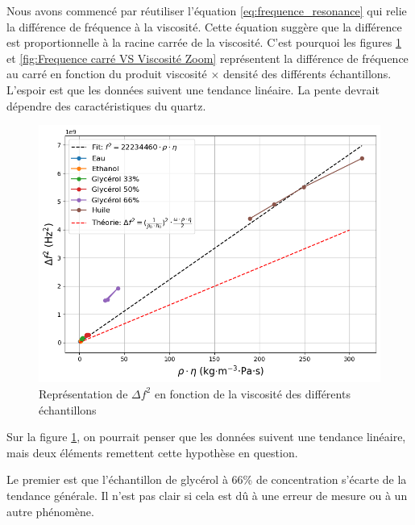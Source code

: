 Nous avons commencé par réutiliser l’équation \eqref{eq:frequence_resonance} qui relie la différence de fréquence à la viscosité.  
Cette équation suggère que la différence est proportionnelle à la racine carrée de la viscosité.  
C’est pourquoi les figures \ref{fig:Frequence carré VS Viscosité} et \ref{fig:Frequence carré VS Viscosité Zoom} représentent la différence de fréquence au carré en fonction du produit viscosité $\times$ densité des différents échantillons.  
L'espoir est que les données suivent une tendance linéaire. La pente devrait dépendre des caractéristiques du quartz.

\begin{figure}[H]
    \centering
    \includegraphics[width=\textwidth]{assets/figures/FrequVisc.png}
    \caption{Représentation de $\Delta f^2$ en fonction de la viscosité des différents échantillons}
    \label{fig:Frequence carré VS Viscosité}
\end{figure}

Sur la figure \ref{fig:Frequence carré VS Viscosité}, on pourrait penser que les données suivent une tendance linéaire, mais deux éléments remettent cette hypothèse en question.

Le premier est que l’échantillon de glycérol à 66\% de concentration s’écarte de la tendance générale.  
Il n’est pas clair si cela est dû à une erreur de mesure ou à un autre phénomène.

